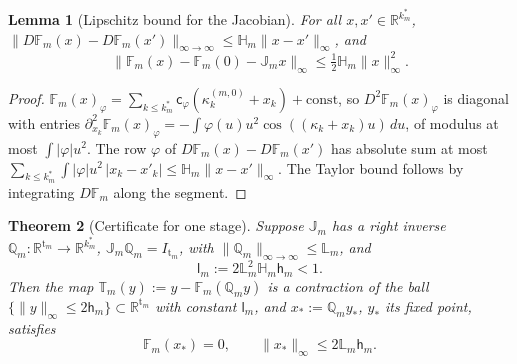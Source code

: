 \documentclass[11pt,reqno]{amsart}
\numberwithin{equation}{section}
\theoremstyle{plain}
\newtheorem{theorem}{Theorem}[section]
\newtheorem{lemma}[theorem]{Lemma}
\theoremstyle{definition}
\theoremstyle{remark}
\begin{document}
\begin{lemma}[Lipschitz bound for the Jacobian]\label{lem:rb-lipschitz}
For all $x,x'\in\mathbb R^{k^*_m}$, $\|D\mathbb F_m(x)-D\mathbb F_m(x')\|_{\infty\to\infty}\le \mathbb H_m\|x-x'\|_\infty$, and
\begin{equation}\label{eq:rb-taylor}
 \|\mathbb F_m(x)-\mathbb F_m(0)-\mathbb J_mx\|_\infty\le\tfrac12\mathbb H_m\|x\|_\infty^2 .
\end{equation}
\end{lemma}

\begin{proof}
$\mathbb F_m(x)_\varphi=\sum_{k\le k^*_m}\mathsf c_\varphi(\kappa^{(m,0)}_k+x_k)+\text{const}$, so $D^2\mathbb F_m(x)_\varphi$ is diagonal with entries $\partial_{x_k}^2\mathbb F_m(x)_\varphi=-\int\varphi(u)u^2\cos((\kappa_k+x_k)u)\,du$, of modulus at most $\int|\varphi|u^2$. The row $\varphi$ of $D\mathbb F_m(x)-D\mathbb F_m(x')$ has absolute sum at most $\sum_{k\le k^*_m}\int|\varphi|u^2\,|x_k-x'_k|\le \mathbb H_m\|x-x'\|_\infty$. The Taylor bound follows by integrating $D\mathbb F_m$ along the segment.
\end{proof}

\begin{theorem}[Certificate for one stage]\label{thm:rb-certificate}
Suppose $\mathbb J_m$ has a right inverse $\mathbb Q_m:\mathbb R^{\mathrm t_m}\to\mathbb R^{k^*_m}$, $\mathbb J_m\mathbb Q_m=I_{\mathrm t_m}$, with $\|\mathbb Q_m\|_{\infty\to\infty}\le \mathbb L_m$, and
\begin{equation}\label{eq:rb-Am}
 \mathsf l_m:=2\mathbb L_m^2\mathbb H_m\mathsf h_m<1 .\tag{A$_m$}
\end{equation}
Then the map $\mathbb T_m(y):=y-\mathbb F_m(\mathbb Q_my)$ is a contraction of the ball $\{\|y\|_\infty\le2\mathsf h_m\}\subset\mathbb R^{\mathrm t_m}$ with constant $\mathsf l_m$, and $x_*:=\mathbb Q_my_*$, $y_*$ its fixed point, satisfies
\begin{equation}\label{eq:rb-cert-conclusion}
 \mathbb F_m(x_*)=0,\qquad\|x_*\|_\infty\le2\mathbb L_m\mathsf h_m .
\end{equation}
\end{theorem}
\end{document}
